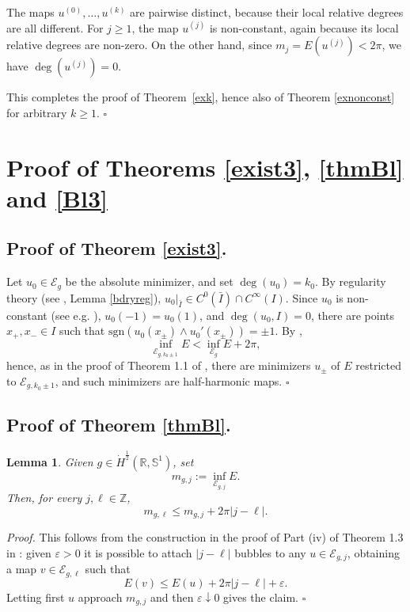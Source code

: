 \documentclass[12pt, a4paper]{article}
\newtheorem{lem}[thm]{Lemma}
\newenvironment{proof}{\noindent\emph{Proof.}}{\hfill$\square$\medskip}
\newcommand{\M}[1]{\mathcal{#1}}
\newcommand{\sph}{\mathbb{S}}
\newcommand{\R}{\mathbb{R}}
\newcommand{\ve}{\varepsilon}
\newcommand{\blu}[1]{{\color{blue}#1}}
\newcommand{\red}[1]{{\color{red}#1}}
\renewcommand{\(}{\left(}
\renewcommand{\)}{\right)}
\begin{document}
The maps $u^{(0)},\dots,u^{(k)}$ are pairwise distinct, because their local relative degrees
are all different. For $j\ge1$, the map $u^{(j)}$ is non-constant, again because its local relative degrees are non-zero. On the other hand, since $m_j=E(u^{(j)})<2\pi$, we have $\deg(u^{(j)})=0$.

This completes the proof of Theorem~\ref{exk}, {hence also of Theorem \ref{exnonconst} for arbitrary $k\ge 1$.} \hfill $\square$


\section{Proof of Theorems \ref{exist3}, \ref{thmBl} and \ref{Bl3}}



\subsection{Proof of Theorem \ref{exist3}.}
Let $u_0\in \mathcal{E}_g$ be the absolute minimizer, and set $\deg(u_0)=k_0$. By regularity theory (see \cite{DLR, Sch}, Lemma \ref{bdryreg}), $u_0|_{\bar I}\in C^0(\bar I)\cap C^\infty(I)$. Since $u_0$ is non-constant (see e.g. \cite[Lemma 4.3]{HM}), $u_0(-1)=u_0(1)$, and $\deg(u_0,I)=0$, there are points $x_+,x_-\in I$ such that $\mathrm{sgn}(u_0(x_\pm)\wedge u_0'(x_\pm) )=\pm 1$. By \cite[Lemma 4.1]{HM},
$$\inf_{\mathcal{E}_{g, k_0\pm 1}}E< \inf_{\mathcal{E}_g} E +2\pi,$$
hence, as in the proof of Theorem 1.1 of \cite{HM}, there are minimizers $u_{\pm}$ of $E$ restricted to $\mathcal{E}_{g, k_0\pm 1}$, and such minimizers are half-harmonic maps. \hfill$\square$


\subsection{Proof of Theorem \ref{thmBl}.}

\begin{lem} \label{l1} {Given $g\in \dot H^\frac{1}{2}(\R,\sph^1)$,} set
\[
m_{g,j}:=\inf_{\M{E}_{g,j}}E .
\]
Then, for every $j,\ell\in\mathbb Z$,
\[
m_{g,\ell}\leq m_{g,j}+2\pi|j-\ell|.
\]
\end{lem}

\begin{proof}
This follows from the construction in the proof of Part (iv) of Theorem 1.3 in \cite{HM}: given $\ve>0$ it is possible to attach $|j-\ell|$ bubbles to any
$u\in \M{E}_{g,j}$, obtaining a map
$v\in \M{E}_{g,\ell}$ such that
\[
E(v)\le E(u)+2\pi |j-\ell|+\ve .
\]
Letting first $u$ approach $m_{g,j}$ and then $\ve\downarrow0$ gives the claim.  
\end{proof}
\end{document}
